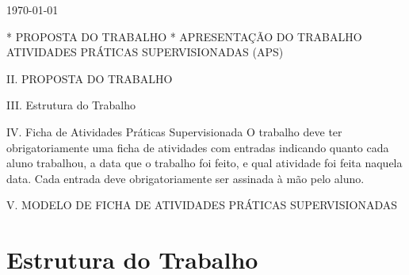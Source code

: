 \documentclass[12pt]{article}
\begin{document}
\begin{titlepage}
%



{\large \today}\\[2cm] %

\vfill %

\end{titlepage}



\tableofcontents





* PROPOSTA DO TRABALHO
* APRESENTAÇÃO DO TRABALHO
ATIVIDADES PRÁTICAS SUPERVISIONADAS (APS)



II. PROPOSTA DO TRABALHO





III. Estrutura do Trabalho





IV. Ficha de Atividades Práticas Supervisionada
O trabalho deve ter obrigatoriamente uma ficha de atividades com entradas indicando quanto cada aluno trabalhou, a data que o trabalho foi feito, e qual atividade foi feita naquela data. Cada entrada deve obrigatoriamente ser assinada à mão pelo aluno.




V. MODELO DE FICHA DE ATIVIDADES PRÁTICAS SUPERVISIONADAS

\section{Estrutura do Trabalho}
\end{document}
